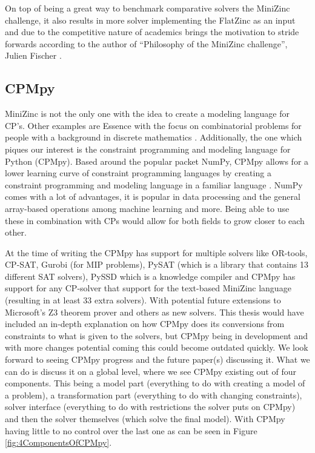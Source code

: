 On top of being a great way to benchmark comparative solvers the MiniZinc challenge, it also results in more solver implementing the FlatZinc as an input and due to the competitive nature of academics brings the motivation to stride forwards according to the author of “Philosophy of the MiniZinc challenge”, Julien Fischer \cite{59stuckey2010philosophy}.

\subsection{CPMpy}
\label{CP:CPMpy}
MiniZinc is not the only one with the idea to create a modeling language for CP’s. Other examples are Essence with the focus on combinatorial problems for people with a background in discrete mathematics \cite{70frisch2008essence}.
Additionally, the one which piques our interest is the constraint programming and modeling language for Python (CPMpy). Based around the popular packet NumPy, CPMpy allows for a lower learning curve of constraint programming languages by creating a constraint programming and modeling language in a familiar language \cite{17guns2019increasing}. NumPy comes with a lot of advantages, it is popular in data processing and the general array-based operations among machine learning and more. 
Being able to use these in combination with CPs would allow for both fields to grow closer to each other. 


At the time of writing the CPMpy has support for multiple solvers like OR-tools, CP-SAT, Gurobi (for MIP problems), PySAT (which is a library that contains 13 different SAT solvers), PySSD which is a knowledge compiler and CPMpy has support for any CP-solver that support for the text-based MiniZinc language \cite{CPMpyDoc, CPMpyGithub} (resulting in at least 33 extra solvers). With potential future extensions to Microsoft’s Z3 theorem prover and others as new solvers.
This thesis would have included an in-depth explanation on how CPMpy does its conversions from constraints to what is given to the solvers, but CPMpy being in development and with more changes potential coming this could become outdated quickly. We look forward to seeing CPMpy progress and the future paper(s) discussing it. What we can do is discuss it on a global level, where we see CPMpy existing out of four components. This being a model part (everything to do with creating a model of a problem), a transformation part (everything to do with changing constraints), solver interface (everything to do with restrictions the solver puts on CPMpy) and then the solver themselves (which solve the final model). With CPMpy having little to no control over the last one as can be seen in Figure \ref{fig:4ComponentsOfCPMpy}.

